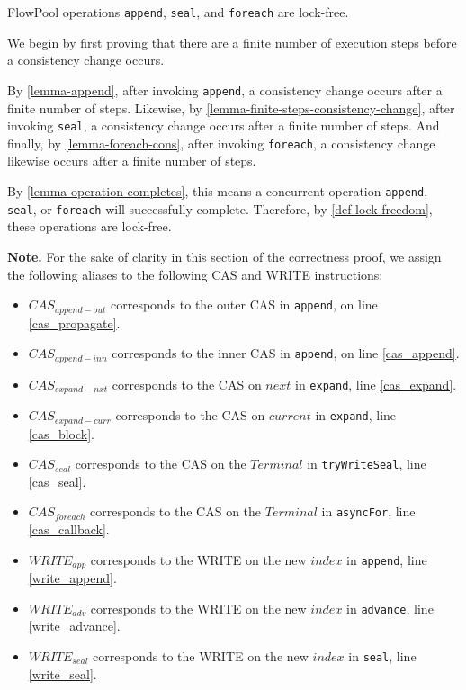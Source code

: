 \documentclass[runningheads,a4paper]{llncs}
\begin{document}
\begin{theorem}\label{theorem-lock-freedom}
FlowPool operations \verb=append=, \verb=seal=, and \verb=foreach= are lock-free.

We begin by first proving that there are a finite number of execution steps
before a consistency change occurs.

By \ref{lemma-append}, after invoking \verb=append=, a consistency
change occurs after a finite number of steps. Likewise, by 
\ref{lemma-finite-steps-consistency-change}, after invoking \verb=seal=, a consistency
change occurs after a finite number of steps. And finally, by
\ref{lemma-foreach-cons},
after invoking \verb=foreach=, a consistency change likewise
occurs after a finite number of steps.

By \ref{lemma-operation-completes}, this means a concurrent operation
\verb=append=, \verb=seal=, or \verb=foreach= will successfully complete.
Therefore, by \ref{def-lock-freedom},  these operations are lock-free.

\end{theorem}


\noindent \textbf{Note.} For the sake of clarity in this section of the
correctness proof, we assign the following aliases to the following CAS and
WRITE instructions:

\begin{itemize}
\setlength{\itemindent}{-1em}
\item $CAS_{append-out}$ corresponds to the outer CAS in \verb=append=, on line \ref{cas_propagate}.
\item $CAS_{append-inn}$ corresponds to the inner CAS in \verb=append=, on line \ref{cas_append}.
\item $CAS_{expand-nxt}$ corresponds to the CAS on $next$ in \verb=expand=, line \ref{cas_expand}.
\item $CAS_{expand-curr}$ corresponds to the CAS on $current$ in \verb=expand=, line \ref{cas_block}.
\item $CAS_{seal}$ corresponds to the CAS on the $Terminal$ in \verb=tryWriteSeal=, line \ref{cas_seal}.
\item $CAS_{foreach}$ corresponds to the CAS on the $Terminal$ in \verb=asyncFor=, line \ref{cas_callback}.
\item $WRITE_{app}$ corresponds to the WRITE on the new $index$ in \verb=append=, line \ref{write_append}.
\item $WRITE_{adv}$ corresponds to the WRITE on the new $index$ in \verb=advance=, line \ref{write_advance}.
\item $WRITE_{seal}$ corresponds to the WRITE on the new $index$ in \verb=seal=, line \ref{write_seal}.
\end{itemize}
\end{document}
